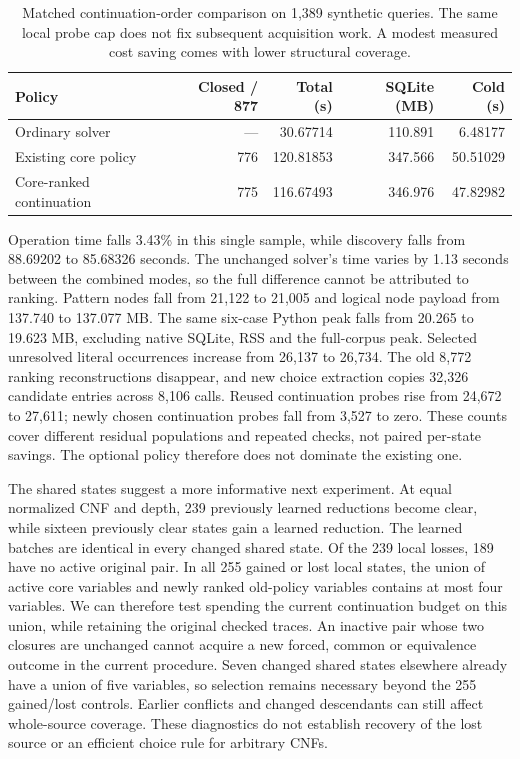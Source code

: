 \documentclass[11pt,a4paper]{article}
\numberwithin{equation}{section}
\theoremstyle{plain}
\theoremstyle{definition}
\theoremstyle{remark}
\begin{document}
\begin{table}[htbp]
\centering
\small
\begin{tabular}{lrrrr}
\hline
Policy & Closed / 877 & Total (s) & SQLite (MB) & Cold (s) \\
\hline
Ordinary solver & --- & 30.67714 & 110.891 & 6.48177 \\
Existing core policy & 776 & 120.81853 & 347.566 & 50.51029 \\
Core-ranked continuation & 775 & 116.67493 & 346.976 & 47.82982 \\
\hline
\end{tabular}
\caption{Matched continuation-order comparison on 1,389 synthetic queries. The same local probe cap does not fix subsequent acquisition work. A modest measured cost saving comes with lower structural coverage.}
\label{tab:core-probe-order}
\end{table}

Operation time falls 3.43\% in this single sample, while discovery falls from 88.69202 to 85.68326 seconds. The unchanged solver's time varies by 1.13 seconds between the combined modes, so the full difference cannot be attributed to ranking. Pattern nodes fall from 21,122 to 21,005 and logical node payload from 137.740 to 137.077 MB. The same six-case Python peak falls from 20.265 to 19.623 MB, excluding native SQLite, RSS and the full-corpus peak. Selected unresolved literal occurrences increase from 26,137 to 26,734. The old 8,772 ranking reconstructions disappear, and new choice extraction copies 32,326 candidate entries across 8,106 calls. Reused continuation probes rise from 24,672 to 27,611; newly chosen continuation probes fall from 3,527 to zero. These counts cover different residual populations and repeated checks, not paired per-state savings. The optional policy therefore does not dominate the existing one.

The shared states suggest a more informative next experiment. At equal normalized CNF and depth, 239 previously learned reductions become clear, while sixteen previously clear states gain a learned reduction. The learned batches are identical in every changed shared state. Of the 239 local losses, 189 have no active original pair. In all 255 gained or lost local states, the union of active core variables and newly ranked old-policy variables contains at most four variables. We can therefore test spending the current continuation budget on this union, while retaining the original checked traces. An inactive pair whose two closures are unchanged cannot acquire a new forced, common or equivalence outcome in the current procedure. Seven changed shared states elsewhere already have a union of five variables, so selection remains necessary beyond the 255 gained/lost controls. Earlier conflicts and changed descendants can still affect whole-source coverage. These diagnostics do not establish recovery of the lost source or an efficient choice rule for arbitrary CNFs.
\end{document}

